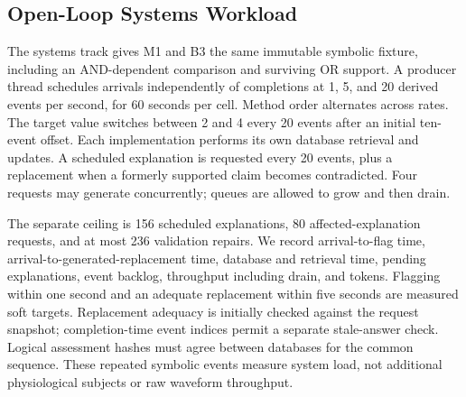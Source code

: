 \subsection{Open-Loop Systems Workload}

The systems track gives M1 and B3 the same immutable symbolic fixture, including
an AND-dependent comparison and surviving OR support. A producer thread schedules
arrivals independently of completions at 1, 5, and 20 derived events per second,
for 60 seconds per cell. Method order alternates across rates. The target value
switches between 2 and 4 every 20 events after an initial ten-event offset.
Each implementation performs its own database retrieval and updates. A scheduled
explanation is requested every 20 events, plus a replacement when a formerly
supported claim becomes contradicted. Four requests may generate concurrently;
queues are allowed to grow and then drain.

The separate ceiling is 156 scheduled explanations, 80 affected-explanation
requests, and at most 236 validation repairs. We record arrival-to-flag time,
arrival-to-generated-replacement time, database and retrieval time, pending
explanations, event backlog, throughput including drain, and tokens. Flagging
within one second and an adequate replacement within five seconds are measured
soft targets. Replacement adequacy is initially checked against the request
snapshot; completion-time event indices permit a separate stale-answer check.
Logical assessment hashes must agree between databases for the common sequence.
These repeated symbolic events measure system load, not additional physiological
subjects or raw waveform throughput.
